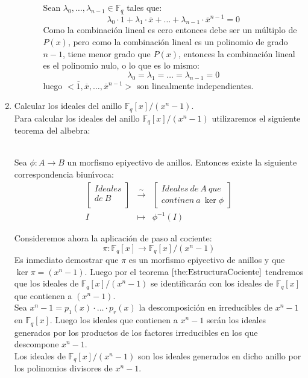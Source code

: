 \begin{enumerate}
\begin{enumerate}
\begin{enumerate}
Sean $\lambda_0,\dots,\lambda_{n-1}\in \mathbb{F}_q$ tales que:
\begin{displaymath}
\lambda_0\cdot \overline{1}+\lambda_1\cdot \overline{x}+\dots+\lambda_{n-1}
\cdot \overline{x}^{n-1} = 0
\end{displaymath}
Como la combinaci\'on lineal es cero entonces debe ser un m\'ultiplo de $P(x)$,
pero como la combinaci\'on lineal es un polinomio de grado $n-1$, tiene menor
grado que $P(x)$, entonces la combinaci\'on lineal es el polinomio nulo, o lo
que es lo mismo:
\begin{displaymath}
\lambda_0=\lambda_1=\dots=\lambda_{n-1}=0
\end{displaymath}
luego $<\overline{1},\overline{x},\dots,\overline{x}^{n-1}>$ son linealmente
independientes.\\ 
\end{enumerate}
\end{enumerate}
\item Calcular los ideales del anillo $\mathbb{F}_q[x]/(x^n-1)$.\\

Para calcular los ideales del anillo $\mathbb{F}_q[x]/(x^n-1)$ utilizaremos el
siguiente teorema del albebra:
\begin{teorema}\label{the:EstructuraCociente}
\ \\
Sea $\phi:A\longrightarrow B$ un morfismo epiyectivo de anillos. Entonces existe
la siguiente correspondencia biun\'{\i}voca:
\begin{eqnarray*}
\left[ \begin{array}{c}
Ideales \\
de \ B\\
\end{array} \right]
&\stackrel{\sim }\longrightarrow &
\left[ \begin{array}{c}
Ideales\ de\ A\ que\\
continen\ a\ \ker \phi
\end{array} \right]\\
I&\longmapsto&\phi^{-1}(I)
\end{eqnarray*}
\end{teorema}
Consideremos ahora la aplicaci\'on de paso al cociente:
\begin{displaymath}
\pi:\mathbb{F}_q[x]\longrightarrow \mathbb{F}_q[x]/(x^n-1)
\end{displaymath}
Es inmediato demostrar que $\pi$ es un morfismo epiyectivo de anillos y que
$\ker \pi = (x^n-1)$. Luego por el teorema $\ref{the:EstructuraCociente}$
tendremos que los ideales de $\mathbb{F}_q[x]/(x^n-1)$ se identificar\'an con
los ideales de $\mathbb{F}_q[x]$ que contienen a $(x^n-1)$.\\

Sea $x^n-1=p_1(x)\cdot \dots \cdot p_r(x)$ la descomposici\'on en
irreducibles de $x^n-1$
en $\mathbb{F}_q[x]$. Luego los ideales que contienen a $x^n-1$ ser\'an los
ideales generados por los productos de los factores irreducibles en los
que descompone $x^n-1$.\\

Los ideales de $\mathbb{F}_q[x]/(x^n-1)$ son los ideales generados en dicho
anillo por los polinomios divisores de $x^n-1$.
\end{enumerate}
